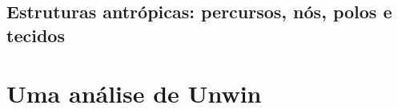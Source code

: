 \documentclass[]{report}
\begin{document}
\section{Estruturas antrópicas: percursos, nós, polos e tecidos}

\chapter{Uma análise de Unwin}
\end{document}
